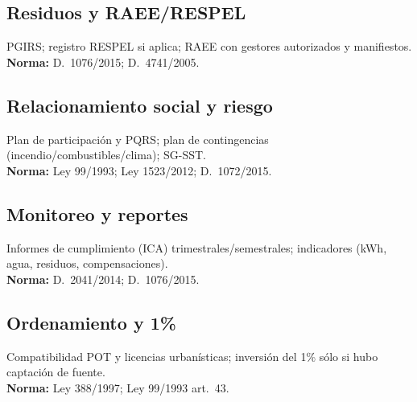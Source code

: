 \subsection{Residuos y RAEE/RESPEL}
PGIRS; registro RESPEL si aplica; RAEE con gestores autorizados y manifiestos.\\
\textbf{Norma:} D.\ 1076/2015; D.\ 4741/2005.

\subsection{Relacionamiento social y riesgo}
Plan de participación y PQRS; plan de contingencias (incendio/combustibles/clima); SG-SST.\\
\textbf{Norma:} Ley 99/1993; Ley 1523/2012; D.\ 1072/2015.

\subsection{Monitoreo y reportes}
Informes de cumplimiento (ICA) trimestrales/semestrales; indicadores (kWh, agua, residuos, compensaciones).\\
\textbf{Norma:} D.\ 2041/2014; D.\ 1076/2015.

\subsection{Ordenamiento y 1\%}
Compatibilidad POT y licencias urbanísticas; inversión del 1\% sólo si hubo captación de fuente.\\
\textbf{Norma:} Ley 388/1997; Ley 99/1993 art.\ 43.
